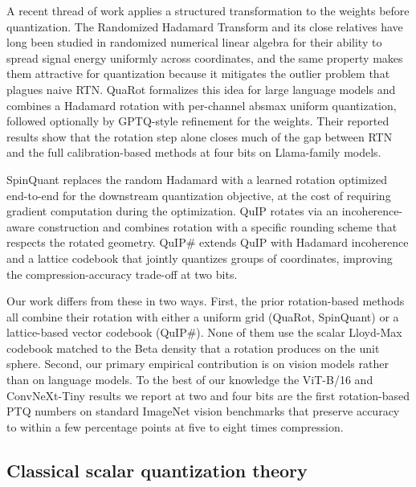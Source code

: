 A recent thread of work applies a structured transformation to the
weights before quantization. The Randomized Hadamard Transform and its
close relatives have long been studied in randomized numerical linear
algebra \citep{ailon2006srht} for their ability to spread signal energy
uniformly across coordinates, and the same property makes them attractive
for quantization because it mitigates the outlier problem that plagues
naive RTN. QuaRot \citep{ashkboos2024quarot} formalizes this idea for
large language models and combines a Hadamard rotation with per-channel
absmax uniform quantization, followed optionally by GPTQ-style
refinement for the weights. Their reported results show that the
rotation step alone closes much of the gap between RTN and the full
calibration-based methods at four bits on Llama-family models.

SpinQuant \citep{liu2024spinquant} replaces the random Hadamard with a
learned rotation optimized end-to-end for the downstream quantization
objective, at the cost of requiring gradient computation during the
optimization. QuIP \citep{chee2023quip} rotates via an incoherence-aware
construction and combines rotation with a specific rounding scheme that
respects the rotated geometry. QuIP\# \citep{tseng2024quipsharp} extends
QuIP with Hadamard incoherence and a lattice codebook that jointly
quantizes groups of coordinates, improving the compression-accuracy
trade-off at two bits.

Our work differs from these in two ways. First, the prior rotation-based
methods all combine their rotation with either a uniform grid
(QuaRot, SpinQuant) or a lattice-based vector codebook (QuIP\#). None of
them use the scalar Lloyd-Max codebook matched to the Beta density that
a rotation produces on the unit sphere. Second, our primary empirical
contribution is on vision models rather than on language models. To the
best of our knowledge the ViT-B/16 and ConvNeXt-Tiny results we report at
two and four bits are the first rotation-based PTQ numbers on standard
ImageNet vision benchmarks that preserve accuracy to within a few
percentage points at five to eight times compression.

\subsection{Classical scalar quantization theory}

